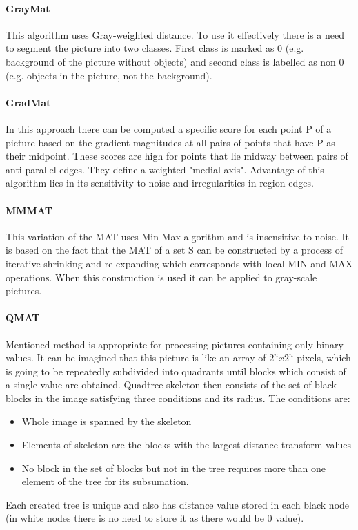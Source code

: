 \paragraph{GrayMat}
This algorithm uses Gray-weighted distance. To use it effectively there is a need to segment the picture into two classes. First class is marked as 0 (e.g. background of the picture without objects) and second class is labelled as non 0 (e.g. objects in the picture, not the background).
\paragraph{GradMat}
In this approach there can be computed a specific score for each point P of a picture based on the gradient magnitudes at all pairs of points that have P as their midpoint. These scores are high for points that lie midway between pairs of anti-parallel edges. They define a weighted "medial axis". 
Advantage of this algorithm lies in its sensitivity to noise and irregularities in region edges.
\paragraph{MMMAT}
This variation of the MAT uses Min Max algorithm and is insensitive to noise. It is based on the fact that the MAT of a set S can be constructed by a process of iterative shrinking and re-expanding which corresponds with local MIN and MAX operations. When this construction is used it can be applied to gray-scale pictures. \cite{MMMAT}
\paragraph{QMAT}
Mentioned method is appropriate for processing pictures containing only binary values. It can be imagined that this picture is like an array of $2^n x 2^n$ pixels, which is going to be repeatedly subdivided into quadrants until blocks which consist of a single value are obtained.
Quadtree skeleton then consists of the set of black blocks in the image satisfying three conditions and its radius. The conditions are:
\begin{itemize}
\item Whole image is spanned by the skeleton
\item Elements of skeleton are the blocks with the largest distance transform values
\item No block in the set of blocks but not in the tree requires more than one element of the tree for its subsumation.
\end{itemize}
Each created tree is unique and also has distance value stored in each black node (in white nodes there is no need to store it as there would be 0 value).

